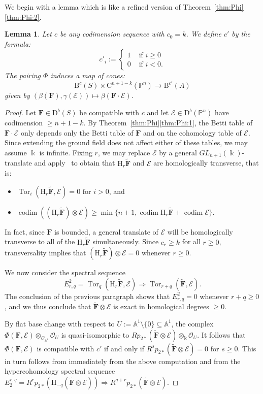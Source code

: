 \documentclass[12pt]{amsart}
\newtheorem{lemma}{Lemma}[section]
\theoremstyle{definition}
\theoremstyle{remark}
\newcommand{\Tor}{\operatorname{Tor}}
\newcommand{\kk}{\Bbbk}
\newcommand{\codim}{\operatorname{codim}}
\newcommand{\PP}{\mathbb{P}}
\renewcommand{\AA}{\mathbb{A}}
\newcommand{\HH}{\mathrm{H}}
\newcommand{\cc}{c}
\newcommand{\cO}{\mathcal{O}}
\newcommand{\cE}{\mathcal{E}}
\newcommand{\FF}{\mathbf{F}}
\newcommand{\GL}{{GL}}
\newcommand{\DD}{\mathrm{D}}
\newcommand{\CQ}{\mathrm{C}}
\newcommand{\BBQ}{\mathrm{B}}
\begin{document}
We begin with a lemma which is like a refined version of Theorem~\ref{thm:Phi}\eqref{thm:Phi:2}.  

\begin{lemma}\label{lem:refined positivity}
Let $\cc$ be any codimension sequence with $\cc_0=k$.   We define $\cc'$ by the formula:
\[
\cc'_i:=\begin{cases}
1&\text{ if } i\geq 0\\%
0&\text{ if } i<0. %
\end{cases}
\]
The  pairing $\Phi$ induces a map of cones:
\[
\BBQ^{\cc}(S)\times \CQ^{n+1-k}(\PP^n)\to \BBQ^{\cc'}(A)
\]
given by $(\beta(\FF), \gamma(\cE))\mapsto \beta(\FF\cdot \cE)$.
\end{lemma}
\begin{proof}
Let $\FF\in \DD^b(S)$ be compatible with $\cc$ and let $\cE\in \DD^{b}(\PP^n)$ have codimension $\geq n+1-k$.  By Theorem~\ref{thm:Phi}\eqref{thm:Phi:1}, the Betti table of $\FF\cdot \cE$ only depends only the Betti table of $\FF$ and on the cohomology table of $\cE$.  Since extending the ground field does not affect either of these tables, we may assume $\kk$ is infinite.  Fixing $r$, we may replace $\cE$ by a general $\GL_{n+1}(\kk)$-translate and apply~\cite[Theorem, p.\ 335]{miller-speyer} to obtain that $\HH_r \widetilde{\FF}$ and $\cE$ are homologically transverse, that is:
\begin{itemize}
	\item $\Tor_i(\HH_r\widetilde{\FF},\cE)=0 \text{ for } i>0$, and
	\item $\codim ((\HH_r\widetilde{\FF})\otimes \cE) \geq \min\{n+1, \codim \HH_r\widetilde{\FF}+\codim \cE\}.$
\end{itemize}
In fact, since $\FF$ is bounded, a general translate of $\cE$ will be homologically transverse to all of the $\HH_r\widetilde{\FF}$ simultaneously.  
Since $c_r\geq k$ for all $r\geq 0$, transversality implies that $(\HH_r\widetilde{\FF})\otimes \cE=0$ whenever $r\geq 0$.


We now consider the spectral sequence
\[
E^2_{r,q}=\Tor_q(\HH_r\widetilde{\FF},\cE)\Rightarrow \Tor_{r+q}(\widetilde{\FF},\cE).
\]
The conclusion of the previous paragraph shows that $E^2_{r,q}=0$ whenever $r+q\geq 0$, and we thus conclude that 
$\widetilde{\FF}\otimes \cE$ is exact in homological degrees $\geq 0$.

By flat base change with respect to $U:=\AA^1\setminus \{0\} \subseteq \AA^1$, the complex $\Phi(\FF,\cE)\otimes_{\cO_{\AA^1}} \cO_{U}$ is quasi-isomorphic to $Rp_{2*}(\widetilde{\FF}\otimes \cE)\otimes_{\kk} \cO_{U}$.  It follows that $\Phi(\FF,\cE)$ is compatible with $\cc'$ if and only if $R^sp_{2*}(\widetilde{\FF}\otimes \cE)=0$ for $s\geq 0$.  This in turn follows from immediately from the above computation and from the hypercohomology spectral sequence
$
E_2^{r,q}=R^{r}p_{2*}(\HH_{-q}(\widetilde{\FF}\otimes \cE))\Rightarrow R^{q+r}p_{2*}(\widetilde{\FF}\otimes \cE).
$
\end{proof}
\end{document}

